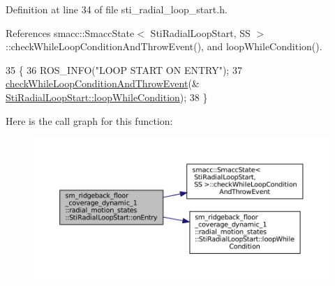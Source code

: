Definition at line 34 of file sti\+\_\+radial\+\_\+loop\+\_\+start.\+h.



References smacc\+::\+Smacc\+State$<$ Sti\+Radial\+Loop\+Start, S\+S $>$\+::check\+While\+Loop\+Condition\+And\+Throw\+Event(), and loop\+While\+Condition().


\begin{DoxyCode}
35   \{
36     ROS\_INFO(\textcolor{stringliteral}{"LOOP START ON ENTRY"});
37     \hyperlink{classsmacc_1_1SmaccState_a80082718f226bebedb589f0c4696001d}{checkWhileLoopConditionAndThrowEvent}(&
      \hyperlink{structsm__ridgeback__floor__coverage__dynamic__1_1_1radial__motion__states_1_1StiRadialLoopStart_a4181a010973c9b49105b65d73805ccd2}{StiRadialLoopStart::loopWhileCondition});
38   \}
\end{DoxyCode}
Here is the call graph for this function\+:
\nopagebreak
\begin{figure}[H]
\begin{center}
\leavevmode
\includegraphics[width=350pt]{structsm__ridgeback__floor__coverage__dynamic__1_1_1radial__motion__states_1_1StiRadialLoopStart_a81bafd7024043822bde8fc63e382f813_cgraph}
\end{center}
\end{figure}
\mbox{\label{structsm__ridgeback__floor__coverage__dynamic__1_1_1radial__motion__states_1_1StiRadialLoopStart_a060b1f8aef3d8b45975091e973062f95}} 
